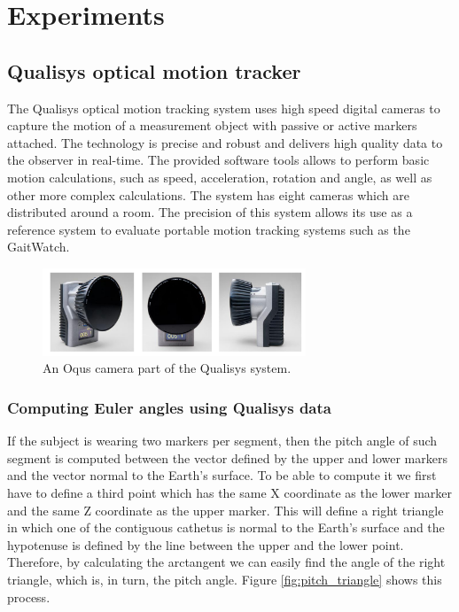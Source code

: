 \chapter{Experiments}
\label{ch:experiments}
\section{Qualisys optical motion tracker}
\indent The Qualisys optical motion tracking system uses high speed digital cameras to capture the motion of a measurement object with passive or active markers attached.
The technology is precise and robust and delivers high quality data to the observer in real-time. The provided software tools allows to perform basic motion calculations, such as speed, acceleration, rotation and angle, as well as other more complex calculations. The system has eight cameras which are distributed around a room. The precision of this system allows its use as a reference system to evaluate portable motion tracking systems such as the GaitWatch.

\begin{figure}[H]
\centering
\includegraphics[width=0.7\textwidth]{figures/qs_cameras}
\caption{An Oqus camera part of the Qualisys system.}
\label{fig:qs_cameras}
\end{figure}

\subsection{Computing Euler angles using Qualisys data}
\indent \indent If the subject is wearing two markers per segment, then the pitch angle of such segment is computed between the vector defined by the upper and lower markers and the vector normal to the Earth's surface. To be able to compute it we first have to define a third point which has the same X coordinate as the lower marker and the same Z coordinate as the upper marker. This will define a right triangle in which one of the contiguous cathetus is normal to the Earth's surface and the hypotenuse is defined by the line between the upper and the lower point. Therefore, by calculating the arctangent we can easily find the angle of the right triangle, which is, in turn, the pitch angle. Figure \ref{fig:pitch_triangle} shows this process.

